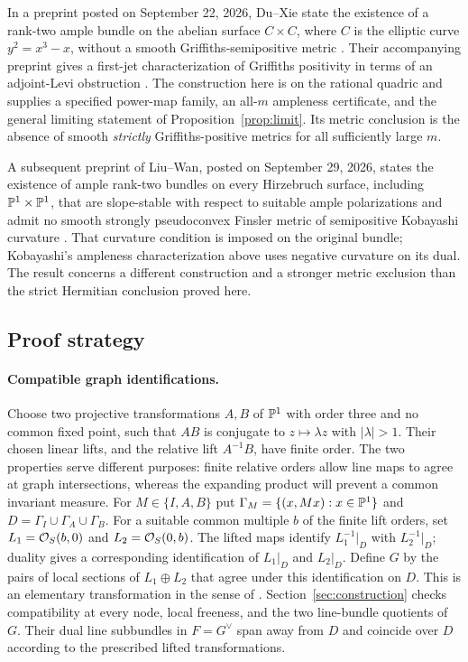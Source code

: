 In a preprint posted on September 22, 2026, Du--Xie state the
existence of a rank-two ample bundle on the abelian surface
$C\times C$, where $C$ is the elliptic curve $y^2=x^3-x$, without
a smooth Griffiths-semipositive metric
\cite[Theorem~1.1]{DuXie2026Counterexample}. Their accompanying
preprint gives a first-jet characterization of Griffiths positivity
in terms of an adjoint-Levi obstruction
\cite[Theorem~1.1]{DuXie2026FirstJet}.
The construction here is on the rational quadric and supplies a
specified power-map family, an all-$m$ ampleness certificate, and
the general limiting statement of Proposition~\ref{prop:limit}.
Its metric conclusion is the absence of smooth \emph{strictly}
Griffiths-positive metrics for all sufficiently large $m$.

A subsequent preprint of Liu--Wan, posted on September 29, 2026,
states the existence of ample rank-two bundles on every Hirzebruch
surface, including $\mathbb P^1\times\mathbb P^1$, that are slope-stable with
respect to suitable ample polarizations and admit no smooth
strongly pseudoconvex Finsler metric of semipositive Kobayashi curvature
\cite[Theorem~1.1]{LiuWan2026}. That curvature condition is imposed on
the original bundle; Kobayashi's ampleness characterization above uses
negative curvature on its dual. The result concerns a different
construction and a stronger metric exclusion than the strict
Hermitian conclusion proved here.

\subsection*{Proof strategy}

\paragraph{Compatible graph identifications.}
Choose two projective transformations $A,B$ of $\mathbb P^1$ with order
three and no common fixed point, such that $AB$ is conjugate to
$z\mapsto\lambda z$ with $|\lambda|>1$. Their chosen linear lifts,
and the relative lift $A^{-1}B$, have finite order. The two properties
serve different purposes: finite relative orders allow line maps to
agree at graph intersections, whereas the expanding product will
prevent a common invariant measure.
For $M\in\{I,A,B\}$ put
$\Gamma_M=\{(x,Mx):x\in\mathbb P^1\}$ and
$D=\Gamma_I\cup\Gamma_A\cup\Gamma_B$.
For a suitable common multiple $b$ of the finite lift orders, set
$L_1=\mathcal O_S(b,0)$ and $L_2=\mathcal O_S(0,b)$.
The lifted maps identify $L_1^{-1}|_D$ with $L_2^{-1}|_D$;
duality gives a corresponding identification of $L_1|_D$ and $L_2|_D$.
Define $G$ by the pairs of local sections of $L_1\oplus L_2$ that
agree under this identification on $D$.
This is an elementary transformation in the sense of
\cite[Introduction, (0.1)]{Maruyama1986}.
Section~\ref{sec:construction} checks compatibility at every node,
local freeness, and the two line-bundle quotients of $G$.
Their dual line subbundles in $F=G^\vee$ span away from $D$ and
coincide over $D$ according to the prescribed lifted transformations.

